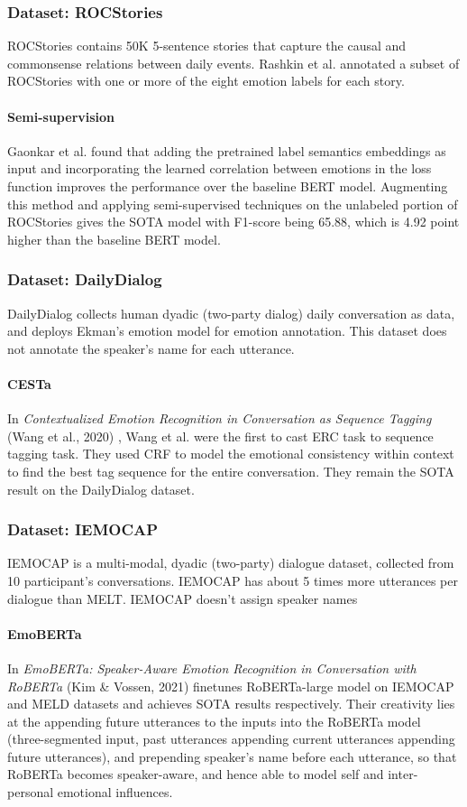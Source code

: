 \documentclass{article}
\begin{document}
\subsubsection{Dataset: ROCStories}
ROCStories contains 50K 5-sentence stories that capture the causal and commonsense relations between daily events. Rashkin et al. annotated a subset of ROCStories with one or more of the eight emotion labels for each story.

\paragraph{Semi-supervision} Gaonkar et al. found that adding the pretrained label semantics embeddings as input and incorporating the learned correlation between emotions in the loss function improves the performance over the baseline BERT model. Augmenting this method and applying semi-supervised techniques on the unlabeled portion of ROCStories gives the SOTA model with F1-score being 65.88, which is 4.92 point higher than the baseline BERT model. 

\subsubsection{Dataset: DailyDialog} DailyDialog collects human dyadic (two-party dialog) daily conversation as data, and deploys Ekman's emotion model for emotion annotation. This dataset does not annotate the speaker's name for each utterance.

\paragraph{CESTa} In \textit{Contextualized Emotion Recognition in Conversation as Sequence Tagging} (Wang et al., 2020) \cite{CESTa}, Wang et al. were the first to cast ERC task to sequence tagging task. They used CRF to model the emotional consistency within context to find the best tag sequence for the entire conversation. They remain the SOTA result on the DailyDialog dataset. 

\subsubsection{Dataset: IEMOCAP} IEMOCAP is a multi-modal, dyadic (two-party) dialogue dataset, collected from 10 participant's conversations. IEMOCAP has about 5 times more utterances per dialogue than MELT. IEMOCAP doesn't assign speaker names

\paragraph{EmoBERTa} In \textit{EmoBERTa: Speaker-Aware Emotion Recognition in Conversation with
RoBERTa} (Kim \& Vossen, 2021) \cite{EmoBERTa} finetunes RoBERTa-large model on IEMOCAP and MELD datasets and achieves SOTA results respectively. Their creativity lies at the appending future utterances to the inputs into the RoBERTa model (three-segmented input, past utterances appending current utterances appending future utterances), and prepending speaker's name before each utterance, so that RoBERTa becomes speaker-aware, and hence able to model self and inter-personal emotional influences. 
\end{document}
